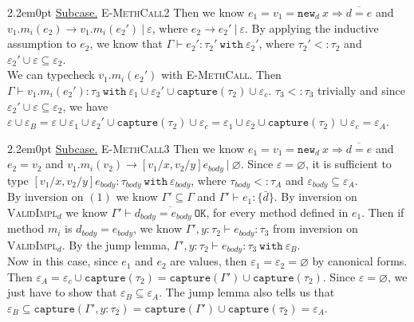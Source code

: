 \documentclass{llncs}
\newcommand{\keywadj}[1]{\mathtt{#1}}
\newcommand{\keyw}[1]{\keywadj{#1}~}
\newcommand{\kw}[1]{\keyw{ #1 }}
\newcommand{\kwa}[1]{\keywadj{ #1 }}
\newcommand{\subcase}[1] {
	\begin{adjustwidth}{2.2em}{0pt}
		\underline{Subcase.} #1
	\end{adjustwidth}
}
\newcommand{\newd}[0]{
	\keywadj{new}_d~x \Rightarrow \overline{d = e}
}
\begin{document}
{{	\subcase{\textsc{E-MethCall2}
	Then we know $e_1 = v_1 = \newd$ and $v_1.m_i(e_2) \longrightarrow v_1.m_i(e_2')~|~\varepsilon$, where $e_2 \longrightarrow e_2'~|~\varepsilon$. By applying the inductive assumption to $e_2$, we know that $\Gamma \vdash e_2' : \tau_2'~\kw{with} \varepsilon_2'$, where $\tau_2' <: \tau_2$ and $\varepsilon_2' \cup \varepsilon \subseteq \varepsilon_2$. \\
	
	\noindent
	We can typecheck $v_1.m_i(e_2')$ with \textsc{E-MethCall}. Then $\Gamma \vdash v_1.m_i(e_2') : \tau_3~\kw{with} \varepsilon_1 \cup \varepsilon_2' \cup \kwa{capture}(\tau_2) \cup \varepsilon_c$. $\tau_3 <: \tau_3$ trivially and since $\varepsilon_2' \cup \varepsilon \subseteq \varepsilon_2$, we have $\varepsilon \cup \varepsilon_B = \varepsilon \cup \varepsilon_1 \cup \varepsilon_2' \cup \kwa{capture}(\tau_2) \cup \varepsilon_c = \varepsilon_1 \cup \varepsilon_2 \cup \kwa{capture}(\tau_2) \cup \varepsilon_c = \varepsilon_A$. \\
	}
	
	\subcase{\textsc{E-MethCall3}
 Then we know $e_1 = v_1 = \newd$ and $e_2 = v_2$ and $v_1.m_i(v_2) \longrightarrow [v_1/x, v_2/y]e_{body}~|~\varnothing$. Since $\varepsilon = \varnothing$, it is sufficient to type $[v_1/x, v_2/y]e_{body} : \tau_{body}~\kw{with} \varepsilon_{body}$, where $\tau_{body} <: \tau_A$ and $\varepsilon_{body} \subseteq \varepsilon_A$. \\
 
\noindent
By inversion on $(1)$ we know $\Gamma' \subseteq \Gamma$ and $\Gamma' \vdash e_1 : \{ \bar d \}$. By inversion on \textsc{ValidImpl$_d$} we know $\Gamma' \vdash \overline{d_{body} = e_{body}~\kwa{OK}}$, for every method defined in $e_1$. Then if method $m_i$ is $d_{body} = e_{body}$, we know $\Gamma', y: \tau_2 \vdash e_{body}: \tau_3$ from inversion on \textsc{ValidImpl$_d$}. By the jump lemma, $\Gamma', y: \tau_2 \vdash e_{body}: \tau_3~\kw{with} \varepsilon_B$. \\

\noindent
Now in this case, since $e_1$ and $e_2$ are values, then $\varepsilon_1 = \varepsilon_2 = \varnothing$ by canonical forms. Then $\varepsilon_A = \varepsilon_c \cup \kwa{capture}(\tau_2) = \kwa{capture}(\Gamma') \cup \kwa{capture}(\tau_2)$. Since $\varepsilon = \varnothing$, we just have to show that $\varepsilon_B \subseteq \varepsilon_A$. The jump lemma also tells us that $\varepsilon_B \subseteq \kwa{capture}(\Gamma', y: \tau_2) = \kwa{capture}(\Gamma') \cup \kwa{capture}(\tau_2) = \varepsilon_A$.\\
}
}

}
\end{document}
